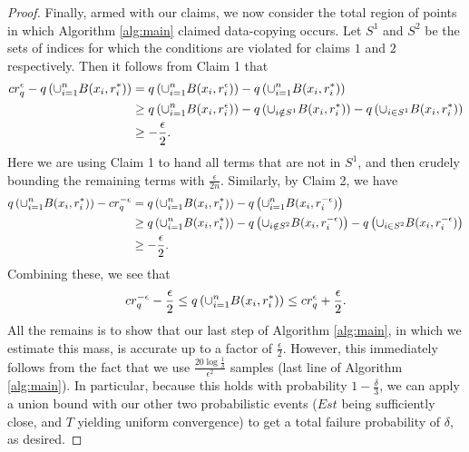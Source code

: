 \begin{proof}
Finally, armed with our claims, we now consider the total region of points in which Algorithm \ref{alg:main} claimed data-copying occurs. Let $S^1$ and $S^2$ be the sets of indices for which the conditions are violated for claims $1$ and $2$ respectively. Then it follows from Claim 1 that 
\begin{equation*}
\begin{split}
cr_q^\epsilon - q \left(\cup_{i= 1}^n B(x_i, r_i^*) \right) &= q \left(\cup_{i= 1}^n B(x_i, r_i^\epsilon)\right) - q \left(\cup_{i= 1}^n B(x_i, r_i^*)\right) \\
&\geq q \left(\cup_{i= 1}^n B(x_i, r_i^\epsilon)\right) - q \left(\cup_{i \notin S^1} B(x_i, r_i^*)\right) - q \left(\cup_{i \in S^1} B(x_i, r_i^*)\right) \\
&\geq -\frac{\epsilon}{2}.
\end{split}
\end{equation*}
Here we are using Claim 1 to hand all terms that are not in $S^1$, and then crudely bounding the remaining terms with $\frac{\epsilon}{2n}$. Similarly, by Claim 2, we have 
\begin{equation*}
\begin{split}
q \left(\cup_{i= 1}^n B(x_i, r_i^*) \right) - cr_q^{-\epsilon} &= q \left(\cup_{i= 1}^n B(x_i, r_i^*)\right) - q \left(\cup_{i= 1}^n B(x_i, r_i^{-\epsilon})\right) \\
&\geq q \left(\cup_{i= 1}^n B(x_i, r_i^*)\right) - q \left(\cup_{i \notin S^2} B(x_i, r_i^{-\epsilon})\right) - q \left(\cup_{i \in S^2} B(x_i, r_i^{-\epsilon})\right) \\
&\geq -\frac{\epsilon}{2}.
\end{split}
\end{equation*}
Combining these, we see that $$cr_q^{-\epsilon} - \frac{\epsilon}{2} \leq q\left(\cup_{i=1}^n B(x_i, r_i^*) \right) \leq cr_q^{\epsilon} + \frac{\epsilon}{2}.$$ All the remains is to show that our last step of Algorithm \ref{alg:main}, in which we estimate this mass, is accurate up to a factor of $\frac{\epsilon}{2}$. However, this immediately follows from the fact that we use $\frac{20\log \frac{1}{\delta}}{\epsilon^2}$ samples (last line of Algorithm \ref{alg:main}). In particular, because this holds with probability $1- \frac{\delta}{3}$, we can apply a union bound with our other two probabilistic events ($Est$ being sufficiently close, and $T$ yielding uniform convergence)  to get a total failure probability of $\delta$, as desired. 
\end{proof}

